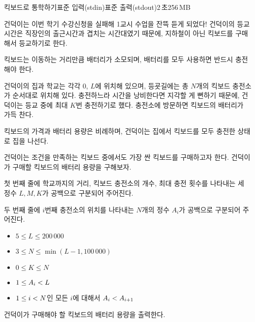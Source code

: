 \begin{problem}{킥보드로 통학하기}{표준 입력(stdin)}{표준 출력(stdout)}{2\,초}{256\,MB}

건덕이는 이번 학기 수강신청을 실패해 1교시 수업을 잔뜩 듣게 되었다! 건덕이의 등교시간은 직장인의 출근시간과 겹치는 시간대였기 때문에, 지하철이 아닌 킥보드를 구매해서 등교하기로 한다.

킥보드는 이동하는 거리만큼 배터리가 소모되며, 배터리를 모두 사용하면 반드시 충전해야 한다.

건덕이의 집과 학교는 각각 $0$, $L$에 위치해 있으며, 등굣길에는 총 $N$개의 킥보드 충전소가 순서대로 위치해 있다. 충전하느라 시간을 낭비한다면 지각할 게 뻔하기 때문에, 건덕이는 등교 중에 최대 $K$번 충전하기로 했다. 충전소에 방문하면 킥보드의 배터리가 가득 찬다.

킥보드의 가격과 배터리 용량은 비례하며, 건덕이는 집에서 킥보드를 모두 충전한 상태로 집을 나선다. 

건덕이는 조건을 만족하는 킥보드 중에서도 가장 싼 킥보드를 구매하고자 한다. 건덕이가 구매할 킥보드의 배터리 용량을 구해보자. 

\InputFile
첫 번째 줄에 학교까지의 거리, 킥보드 충전소의 개수, 최대 충전 횟수를 나타내는 세 정수 $L, M, K$가 공백으로 구분되어 주어진다.

두 번째 줄에 $i$번째 충전소의 위치를 나타내는 $N$개의 정수 $A_i$가 공백으로 구분되어 주어진다.

\newcommand{\lt}{\ensuremath <}
\newcommand{\gt}{\ensuremath >}
\begin{itemize}
 \item $5 \le L \le 200\,000$

 \item $3 \le N \le \min(L - 1, 100\,000)$

 \item $0 \le K \le N$

 \item $1 \le A_i \lt L$

 \item $1 \le i \lt N$인 모든 $i$에 대해서 $A_i \lt A_{i+1}$
\end{itemize}


\OutputFile
건덕이가 구매해야 할 킥보드의 배터리 용량을 출력한다.

\Examples

\begin{example}
%
%
\end{example}

\end{problem}

